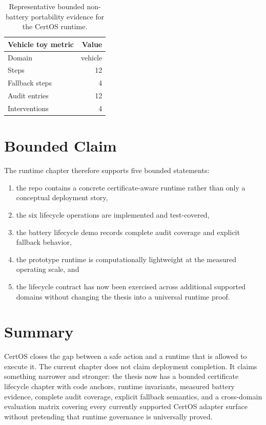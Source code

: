 \begin{table}[ht]
\centering
\caption{Representative bounded non-battery portability evidence for the
CertOS runtime.}
\label{tab:certos-vehicle-toy}
\begin{tabular}{lr}
\toprule
\textbf{Vehicle toy metric} & \textbf{Value} \\
\midrule
Domain & vehicle \\
Steps & 12 \\
Fallback steps & 4 \\
Audit entries & 12 \\
Interventions & 4 \\
\bottomrule
\end{tabular}
\end{table}


\section{Bounded Claim}

The runtime chapter therefore supports five bounded statements:

\begin{enumerate}
  \item the repo contains a concrete certificate-aware runtime rather than
    only a conceptual deployment story,
  \item the six lifecycle operations are implemented and test-covered,
  \item the battery lifecycle demo records complete audit coverage and
    explicit fallback behavior,
  \item the prototype runtime is computationally lightweight at the measured
    operating scale, and
  \item the lifecycle contract has now been exercised across additional
    supported domains without changing the thesis into a universal runtime
    proof.
\end{enumerate}

\section{Summary}

CertOS closes the gap between a safe action and a runtime that is allowed to
execute it.  The current chapter does not claim deployment completion.  It
claims something narrower and stronger: the thesis now has a bounded
certificate lifecycle chapter with code anchors, runtime invariants, measured
battery evidence, complete audit coverage, explicit fallback semantics, and a
cross-domain evaluation matrix covering every currently supported CertOS
adapter surface without pretending that runtime governance is universally
proved.
